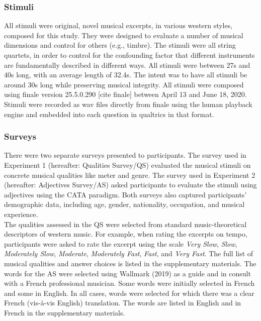 \documentclass[
  english,
  man,floatsintext]{apa6}
\begin{document}
\hypertarget{stimuli}{%
\subsubsection{Stimuli}\label{stimuli}}

All stimuli were original, novel musical excerpts, in various western styles, composed for this study. They were designed to evaluate a number of musical dimensions and control for others (e.g., timbre). The stimuli were all string quartets, in order to control for the confounding factor that different instruments are fundamentally described in different ways. All stimuli were between 27s and 40s long, with an average length of 32.4s. The intent was to have all stimuli be around 30s long while preserving musical integrity. All stimuli were composed using finale version 25.5.0.290 {[}cite finale{]} between April 13 and June 18, 2020. Stimuli were recorded as wav files directly from finale using the human playback engine and embedded into each question in qualtrics in that format.

\hypertarget{surveys}{%
\subsubsection{Surveys}\label{surveys}}

There were two separate surveys presented to participants. The survey used in Experiment 1 (hereafter: Qualities Survey/QS) evaluated the musical stimuli on concrete musical qualities like meter and genre. The survey used in Experiment 2 (hereafter: Adjectives Survey/AS) asked participants to evaluate the stimuli using adjectives using the CATA paradigm. Both surveys also captured participants' demographic data, including age, gender, nationality, occupation, and musical experience.\\
The qualities assessed in the QS were selected from standard music-theoretical descriptors of western music. For example, when rating the excerpts on tempo, participants were asked to rate the excerpt using the scale \emph{Very Slow}, \emph{Slow}, \emph{Moderately Slow}, \emph{Moderate}, \emph{Moderately Fast}, \emph{Fast}, and \emph{Very Fast}. The full list of musical qualities and answer choices is listed in the supplementary materials. The words for the AS were selected using Wallmark (2019) as a guide and in consult with a French professional musician. Some words were initially selected in French and some in English. In all cases, words were selected for which there was a clear French (vis-à-vis English) translation. The words are listed in English and in French in the supplementary materials.
\end{document}
